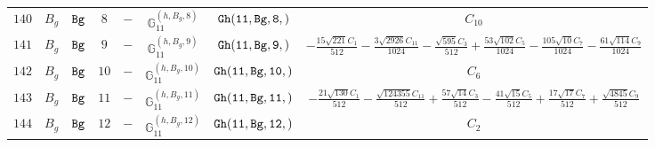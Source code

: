 \documentclass[fleqn,8pt]{jsarticle}
\begin{document}
\begin{table}[ht!]
\begin{center}
\begin{tabular}{cccccccc}
$ 140 $ & $ B_{g} $ & $ {\tt Bg} $ & $ 8 $ & $ - $ & $ \mathbb{G}_{11}^{(h,B_{g},8)} $ & $ {\tt Gh(11,Bg,8,)} $ & $ C_{10} $ \\
$ 141 $ & $ B_{g} $ & $ {\tt Bg} $ & $ 9 $ & $ - $ & $ \mathbb{G}_{11}^{(h,B_{g},9)} $ & $ {\tt Gh(11,Bg,9,)} $ & $ - \frac{15 \sqrt{221} C_{1}}{512} - \frac{3 \sqrt{2926} C_{11}}{1024} - \frac{\sqrt{595} C_{3}}{512} + \frac{53 \sqrt{102} C_{5}}{1024} - \frac{105 \sqrt{10} C_{7}}{1024} - \frac{61 \sqrt{114} C_{9}}{1024} $ \\
$ 142 $ & $ B_{g} $ & $ {\tt Bg} $ & $ 10 $ & $ - $ & $ \mathbb{G}_{11}^{(h,B_{g},10)} $ & $ {\tt Gh(11,Bg,10,)} $ & $ C_{6} $ \\
$ 143 $ & $ B_{g} $ & $ {\tt Bg} $ & $ 11 $ & $ - $ & $ \mathbb{G}_{11}^{(h,B_{g},11)} $ & $ {\tt Gh(11,Bg,11,)} $ & $ - \frac{21 \sqrt{130} C_{1}}{512} - \frac{\sqrt{124355} C_{11}}{512} + \frac{57 \sqrt{14} C_{3}}{512} - \frac{41 \sqrt{15} C_{5}}{512} + \frac{17 \sqrt{17} C_{7}}{512} + \frac{\sqrt{4845} C_{9}}{512} $ \\
$ 144 $ & $ B_{g} $ & $ {\tt Bg} $ & $ 12 $ & $ - $ & $ \mathbb{G}_{11}^{(h,B_{g},12)} $ & $ {\tt Gh(11,Bg,12,)} $ & $ C_{2} $ \\
 \hline \hline
\end{tabular}
\end{center}
\end{table}
\end{document}
